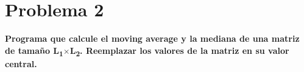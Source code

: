 \section*{Problema 2}

\textbf{Programa que calcule el moving average y la mediana de una matriz de tamaño L\textsubscript{1}$\mathbf{\times}$L\textsubscript{2}. Reemplazar los valores de la matriz en su valor central.}